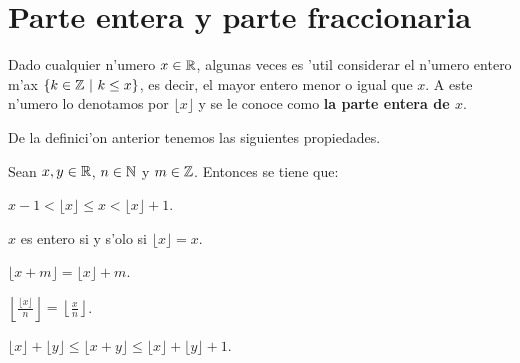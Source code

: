 \section{Parte entera y parte fraccionaria}
\label{parteentera}

Dado cualquier n'umero $x \in \mathbb{R}$, algunas veces es 'util considerar
el n'umero entero m'ax $\{ k \in \mathbb{Z} \ | \ k \leq x\}$, es decir, 
el mayor entero menor o igual que $x$. A este n'umero lo denotamos por 
$\lfloor x \rfloor$ y se le conoce como 
{\bf la parte entera de $x$}.

De la definici'on anterior tenemos las siguientes propiedades.

\begin{propiedades} Sean $x, y \in \mathbb{R}$, $n \in \mathbb{N}$ y $m \in \mathbb{Z}$. 
Entonces se tiene que:
\begin{description}\label{parteentera}
\item[$(a)$] $x-1<\lfloor x \rfloor \leq x < \lfloor x \rfloor +1$.
\item[$(b)$]  $x$ es entero si y s'olo si $\lfloor x \rfloor=x$.
\item[$(c)$] $\lfloor x +m \rfloor= \lfloor x \rfloor +m$.
\item[$(d)$] $\left\lfloor \frac{\lfloor x \rfloor}{n}\right\rfloor =
 \left\lfloor \frac{x}{n}\right\rfloor$.
\item[$(e)$]  $\lfloor x \rfloor + \lfloor y \rfloor \leq
\lfloor x +y \rfloor \leq \lfloor x \rfloor + \lfloor y \rfloor +1$.
\end{description}
\end{propiedades}



